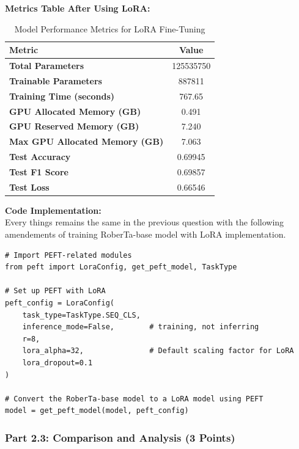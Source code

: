 \documentclass[11pt, oneside]{article}   	%
\begin{document}
\textbf{Metrics Table After Using LoRA: }
\\
\begin{table}[h!]
    \centering
    \begin{tabular}{|l|c|}
    \hline
    \textbf{Metric}                            & \textbf{Value}      \\ \hline
    \textbf{Total Parameters}                  & 125535750   \\ \hline
    \textbf{Trainable Parameters}              & 887811    \\ \hline
    \textbf{Training Time (seconds)}           & 767.65             \\ \hline
    \textbf{GPU Allocated Memory (GB)}         & 0.491              \\ \hline
    \textbf{GPU Reserved Memory (GB)}          & 7.240              \\ \hline
    \textbf{Max GPU Allocated Memory (GB)}     & 7.063              \\ \hline
    \textbf{Test Accuracy}                     & 0.69945            \\ \hline
    \textbf{Test F1 Score}                     & 0.69857            \\ \hline
    \textbf{Test Loss}                         & 0.66546            \\ \hline
    \end{tabular}
    \caption{Model Performance Metrics for LoRA Fine-Tuning}
\end{table}

\textbf{Code Implementation: }
\\
Every things remains the same in the previous question with the following amendements of training RoberTa-base model with LoRA implementation.
\begin{verbatim}
# Import PEFT-related modules
from peft import LoraConfig, get_peft_model, TaskType  

# Set up PEFT with LoRA
peft_config = LoraConfig(
    task_type=TaskType.SEQ_CLS,
    inference_mode=False,        # training, not inferring
    r=8,
    lora_alpha=32,               # Default scaling factor for LoRA
    lora_dropout=0.1
)

# Convert the RoberTa-base model to a LoRA model using PEFT
model = get_peft_model(model, peft_config)
\end{verbatim}

\subsubsection*{Part 2.3: Comparison and Analysis (3 Points)}
\end{document}
